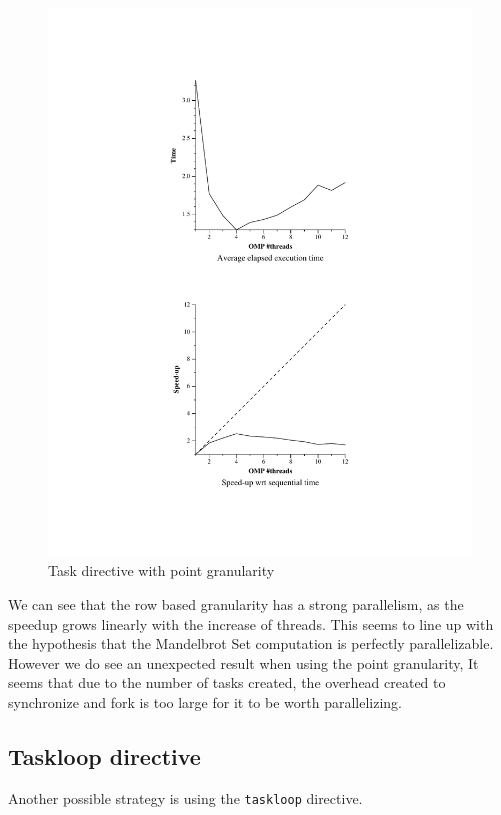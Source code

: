 \documentclass[11pt]{article}
\begin{document}
\begin{figure}[!htb]
\begin{minipage}[t]{0.48\textwidth}
    \centerline{\includegraphics[width=1.5\linewidth]{./Task/point/point.pdf}}
    \caption{Task directive with point granularity}
  \end{minipage}
\end{figure}

We can see that the row based granularity has a strong parallelism, as the speedup grows linearly with the increase of threads. This seems to line up with the hypothesis that the Mandelbrot Set computation is perfectly parallelizable. However we do see an unexpected result when using the point granularity, It seems that due to the number of tasks created, the overhead created to synchronize and fork is too large for it to be worth parallelizing.

\FloatBarrier
\subsection{Taskloop directive}
Another possible strategy is using the \texttt{taskloop} directive.  
\end{document}
